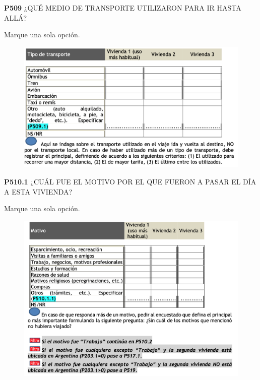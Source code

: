 \documentclass[
  openany]{book}
\begin{document}
\textbf{P509} ¿QUÉ MEDIO DE TRANSPORTE UTILIZARON PARA IR HASTA ALLÁ?

Marque una sola opción.

\begin{figure}

{\centering \includegraphics[width=1\linewidth]{imagenes/figura6-196} 

}

\end{figure}

\textbf{P510.1} ¿CUÁL FUE EL MOTIVO POR EL QUE FUERON A PASAR EL DÍA A ESTA VIVIENDA?

Marque una sola opción.

\begin{figure}

{\centering \includegraphics[width=1\linewidth]{imagenes/figura6-197} 

}

\end{figure}
\end{document}
